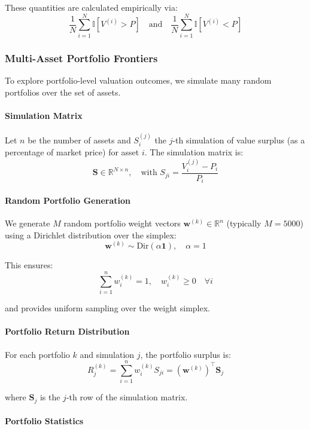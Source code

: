 These quantities are calculated empirically via:
\[
\frac{1}{N} \sum_{i=1}^N \mathbb{I}[V^{(i)} > P]
\quad \text{and} \quad
\frac{1}{N} \sum_{i=1}^N \mathbb{I}[V^{(i)} < P]
\]

\subsubsection{Multi-Asset Portfolio Frontiers}

To explore portfolio-level valuation outcomes, we simulate many random portfolios over the set of assets.

\paragraph{Simulation Matrix}

Let $n$ be the number of assets and $S^{(j)}_i$ the $j$-th simulation of value surplus (as a percentage of market price) for asset $i$. The simulation matrix is:
\[
\mathbf{S} \in \mathbb{R}^{N \times n}, \quad \text{with } S_{ji} = \frac{V^{(j)}_i - P_i}{P_i}
\]

\paragraph{Random Portfolio Generation}

We generate $M$ random portfolio weight vectors $\mathbf{w}^{(k)} \in \mathbb{R}^n$ (typically $M = 5000$) using a Dirichlet distribution over the simplex:
\[
\mathbf{w}^{(k)} \sim \text{Dir}(\alpha \mathbf{1}), \quad \alpha = 1
\]

This ensures:
\[
\sum_{i=1}^n w^{(k)}_i = 1, \quad w^{(k)}_i \geq 0 \quad \forall i
\]

and provides uniform sampling over the weight simplex.

\paragraph{Portfolio Return Distribution}

For each portfolio $k$ and simulation $j$, the portfolio surplus is:
\[
R^{(k)}_j = \sum_{i=1}^n w^{(k)}_i S_{ji} = (\mathbf{w}^{(k)})^\top \mathbf{S}_j
\]

where $\mathbf{S}_j$ is the $j$-th row of the simulation matrix.

\paragraph{Portfolio Statistics}

